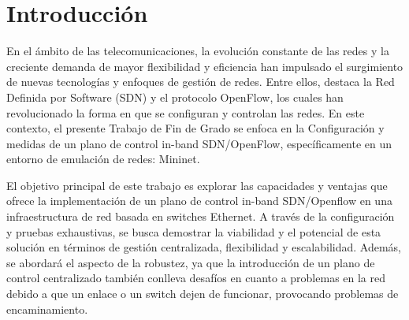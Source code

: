 \documentclass[a4paper, 12pt]{book}
\begin{document}
	
	
	\tableofcontents 
	\cleardoublepage
	\listoffigures %
	
	
	
	\clearpage
	\chapter{Introducción}
	\label{sec:intro} %
	
	
	En el ámbito de las telecomunicaciones, la evolución constante de las redes y la creciente demanda de mayor flexibilidad y eficiencia han impulsado el surgimiento de nuevas tecnologías y enfoques de gestión de redes. Entre ellos, destaca la Red Definida por Software (SDN) y el protocolo OpenFlow, los cuales han revolucionado la forma en que se configuran y controlan las redes. En este contexto, el presente Trabajo de Fin de Grado se enfoca en la Configuración y medidas de un plano de control in-band SDN/OpenFlow, específicamente en un entorno de emulación de redes: Mininet.
	
	El objetivo principal de este trabajo es explorar las capacidades y ventajas que ofrece la implementación de un plano de control in-band SDN/Openflow en una infraestructura de red basada en switches Ethernet. A través de la configuración y pruebas exhaustivas, se busca demostrar la viabilidad y el potencial de esta solución en términos de gestión centralizada, flexibilidad y escalabilidad. Además, se abordará el aspecto de la robustez, ya que la introducción de un plano de control centralizado también conlleva desafíos en cuanto a problemas en la red debido a que un enlace o un switch dejen de funcionar, provocando problemas de encaminamiento.
	
\end{document}
